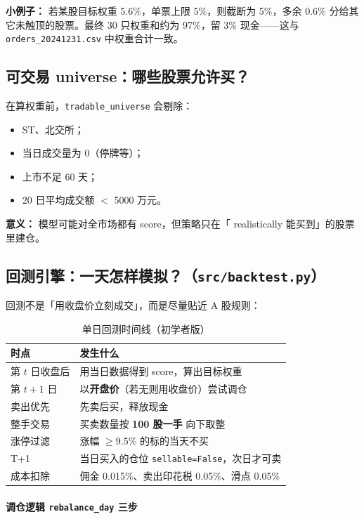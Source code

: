 \documentclass[UTF8,a4paper,12pt]{ctexart}
\begin{document}
\textbf{小例子：} 若某股目标权重 5.6\%，单票上限 5\%，则截断为 5\%，多余 0.6\% 分给其它未触顶的股票。最终 30 只权重和约为 97\%，留 3\% 现金——这与 \texttt{orders\_20241231.csv} 中权重合计一致。

\subsection{可交易 universe：哪些股票允许买？}

在算权重前，\texttt{tradable\_universe} 会剔除：
\begin{itemize}[leftmargin=2em]
  \item ST、北交所；
  \item 当日成交量为 0（停牌等）；
  \item 上市不足 60 天；
  \item 20 日平均成交额 $<$ 5000 万元。
\end{itemize}
\textbf{意义：} 模型可能对全市场都有 score，但策略只在「 realistically 能买到」的股票里建仓。

\subsection{回测引擎：一天怎样模拟？（\texttt{src/backtest.py}）}

回测不是「用收盘价立刻成交」，而是尽量贴近 A 股规则：

\begin{table}[H]
\centering
\caption{单日回测时间线（初学者版）}
\label{tab:bt-timeline}
\small
\begin{tabular}{p{2.2cm}p{10.5cm}}
\toprule
\textbf{时点} & \textbf{发生什么} \\
\midrule
第 $t$ 日收盘后 & 用当日数据得到 score，算出目标权重 \\
第 $t\!+\!1$ 日 & 以\textbf{开盘价}（若无则用收盘价）尝试调仓 \\
卖出优先 & 先卖后买，释放现金 \\
整手交易 & 买卖数量按 \textbf{100 股一手} 向下取整 \\
涨停过滤 & 涨幅 $\ge 9.5\%$ 的标的当天不买 \\
T+1 & 当日买入的仓位 \texttt{sellable=False}，次日才可卖 \\
成本扣除 & 佣金 0.015\%、卖出印花税 0.05\%、滑点 0.05\% \\
\bottomrule
\end{tabular}
\end{table}

\paragraph{调仓逻辑 \texttt{rebalance\_day} 三步}
\end{document}

